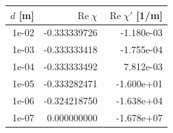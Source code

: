 \begin{tabular}{rrr}
\toprule
$d$ [m] & $\operatorname{Re}\chi$ & $\operatorname{Re}\chi'$ [1/m]\\
\midrule
1e-02 & -0.333339726 & -1.180e-03\\
1e-03 & -0.333333418 & -1.755e-04\\
1e-04 & -0.333333492 & 7.812e-03\\
1e-05 & -0.333282471 & -1.600e+01\\
1e-06 & -0.324218750 & -1.638e+04\\
1e-07 & 0.000000000 & -1.678e+07\\
\bottomrule
\end{tabular}
